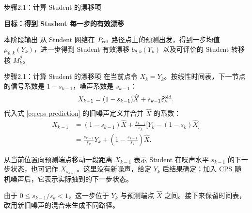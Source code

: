 \documentclass[10pt,aspectratio=169]{beamer}
\begin{document}
\begin{frame}{步骤2.1：计算 Student 的漂移项}
\begin{center}
\vfill
{\Large\bfseries 目标：得到 Student 每一步的有效漂移}
\vspace{5mm}
\begin{block}{本阶段输出}
从 Student 网络在 $P_{\rm ref}$ 路径点上的预测出发，得到一步均值
$\mu_{\theta,k}(Y_k)$，进一步得到 Student 有效漂移 $b_{\theta,k}(Y_k)$
以及可评价的 Student 转移核 $M_k^\theta$。
\end{block}
\vfill
\end{center}
\end{frame}
\begin{frame}{步骤2.1：计算 Student 的漂移项}
\small
在当前点令 $X_k=Y_k$。按线性时间表，下一节点的信号系数是 $1-s_{k-1}$，噪声系数是 $s_{k-1}$：
\begin{equation}\label{eq:deterministic-cps}
X_{k-1}=(1-s_{k-1})\widehat X+s_{k-1}\widehat\varepsilon_k^{\rm old}.
\end{equation}
代入式 \eqref{eq:cps-prediction} 的旧噪声定义并合并 $\widehat X$ 的系数：
\begin{equation}\label{eq:deterministic-interpolation}
\begin{aligned}
X_{k-1}
&=(1-s_{k-1})\widehat X+\frac{s_{k-1}}{s_k}\bigl[Y_k-(1-s_k)\widehat X\bigr]\\
&=\boxed{\frac{s_{k-1}}{s_k}Y_k+\left(1-\frac{s_{k-1}}{s_k}\right)\widehat X}.
\end{aligned}
\end{equation}
\begin{block}{从当前位置向预测端点移动一段距离}
$X_{k-1}$ 表示 Student 在噪声水平 $s_{k-1}$ 的下一步状态，也可记作 $X_{s_{k-1}}$。这里没有新噪声，给定 $Y_k$ 后结果确定；加入 CPS 随机噪声后，它表示实际抽到的下一步状态。
\end{block}
由于 $0\le s_{k-1}/s_k<1$，这一步位于 $Y_k$ 与预测端点 $\widehat X$ 之间。接下来保留时间表，改用新旧噪声的混合来生成不同路径。
\end{frame}
\end{document}

